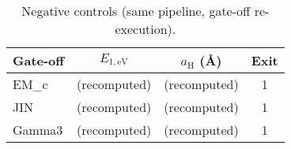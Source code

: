 \begin{table}[t]
\caption{Negative controls (same pipeline, gate-off re-execution).}\label{tab:neg}
\centering
\begin{tabular}{lccc}
\toprule
Gate-off & $E_{1,\mathrm{eV}}$ & $a_{\mathrm{H}}$ (\AA) & Exit \\
\midrule
EM_c & (recomputed) & (recomputed) & 1 \\
JIN & (recomputed) & (recomputed) & 1 \\
Gamma3 & (recomputed) & (recomputed) & 1 \\
\bottomrule
\end{tabular}
\end{table}
